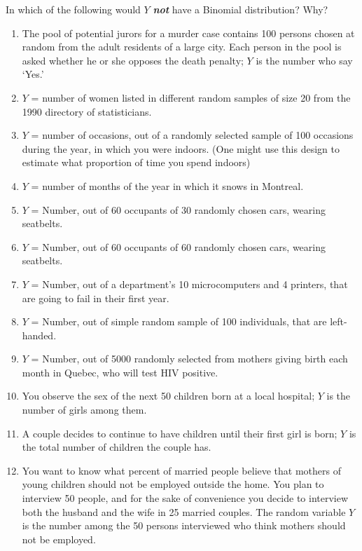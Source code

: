\documentclass[]{book}
\providecommand{\tightlist}{%
  \setlength{\itemsep}{0pt}\setlength{\parskip}{0pt}}
\begin{document}
In which of the following would \(Y\) \emph{\textbf{not}} have a Binomial distribution? Why?

\begin{enumerate}
\def\labelenumi{\arabic{enumi}.}
\tightlist
\item
  The pool of potential jurors for a murder case contains 100 persons chosen at random from the adult residents of a large city. Each person in the pool is asked whether he or she opposes the death penalty; \(Y\) is the number who say `Yes.'
\item
  \(Y\) = number of women listed in different random samples of size 20 from the 1990 directory of statisticians.
\item
  \(Y\) = number of occasions, out of a randomly selected sample of 100 occasions during the year, in which you were indoors. (One might use this design to estimate what proportion of time you spend indoors)
\item
  \(Y\) = number of months of the year in which it snows in Montreal.
\item
  \(Y\) = Number, out of 60 occupants of 30 randomly chosen cars, wearing seatbelts.
\item
  \(Y\) = Number, out of 60 occupants of 60 randomly chosen cars, wearing seatbelts.
\item
  \(Y\) = Number, out of a department's 10 microcomputers and 4 printers, that are going to fail in their first year.
\item
  \(Y\) = Number, out of simple random sample of 100 individuals, that are left-handed.
\item
  \(Y\) = Number, out of 5000 randomly selected from mothers giving birth each month in Quebec, who will test HIV positive.\\
\item
  You observe the sex of the next 50 children born at a local hospital; \(Y\) is the number of girls among them.
\item
  A couple decides to continue to have children until their first girl is born; \(Y\) is the total number of children the couple has.
\item
  You want to know what percent of married people believe that mothers of young children should not be employed outside the home. You plan to interview 50 people, and for the sake of convenience you decide to interview both the husband and the wife in 25 married couples. The random variable \(Y\) is the number among the 50 persons interviewed who think mothers should not be employed.
\end{enumerate}
\end{document}
